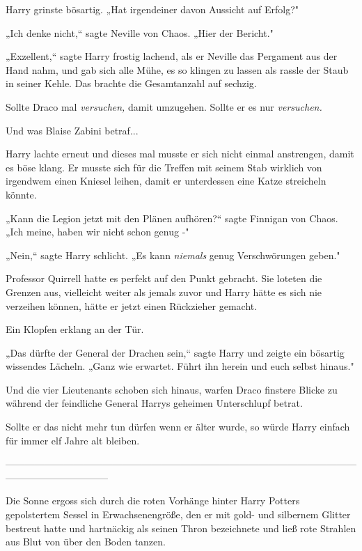 {Harry grinste bösartig. „Hat irgendeiner davon Aussicht auf Erfolg?"

„Ich denke nicht,“ sagte Neville von Chaos. „Hier der Bericht."

„Exzellent,“ sagte Harry frostig lachend, als er Neville das Pergament aus der Hand nahm, und gab sich alle Mühe, es so klingen zu lassen als rassle der Staub in seiner Kehle. Das brachte die Gesamtanzahl auf sechzig.

Sollte Draco mal \emph{versuchen,} damit umzugehen. Sollte er es nur \emph{versuchen.}

Und was Blaise Zabini betraf...

Harry lachte erneut und dieses mal musste er sich nicht einmal anstrengen, damit es böse klang. Er musste sich für die Treffen mit seinem Stab wirklich von irgendwem einen Kniesel leihen, damit er unterdessen eine Katze streicheln könnte.

„Kann die Legion jetzt mit den Plänen aufhören?“ sagte Finnigan von Chaos. „Ich meine, haben wir nicht schon genug -"

„Nein,“ sagte Harry schlicht. „Es kann \emph{niemals} genug Verschwörungen geben."

Professor Quirrell hatte es perfekt auf den Punkt gebracht. Sie loteten die Grenzen aus, vielleicht weiter als jemals zuvor und Harry hätte es sich nie verzeihen können, hätte er jetzt einen Rückzieher gemacht.

Ein Klopfen erklang an der Tür.

„Das dürfte der General der Drachen sein,“ sagte Harry und zeigte ein bösartig wissendes Lächeln. „Ganz wie erwartet. Führt ihn herein und euch selbst hinaus."

Und die vier Lieutenants schoben sich hinaus, warfen Draco finstere Blicke zu während der feindliche General Harrys geheimen Unterschlupf betrat.

Sollte er das nicht mehr tun dürfen wenn er älter wurde, so würde Harry einfach für immer elf Jahre alt bleiben.

--------------------------------------------------------------------------------------------------------------------------------------------

\hfill\break Die Sonne ergoss sich durch die roten Vorhänge hinter Harry Potters gepolstertem Sessel in Erwachsenengröße, den er mit gold- und silbernem Glitter bestreut hatte und hartnäckig als seinen Thron bezeichnete und ließ rote Strahlen aus Blut von über den Boden tanzen.

}
